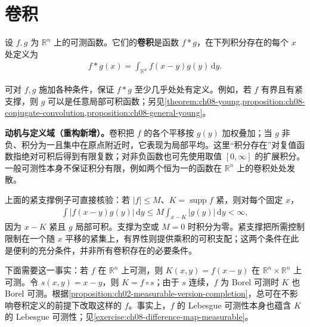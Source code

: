 \documentclass[../../main.tex]{subfiles}
\begin{document}
\section{卷积}\label{section:ch08-convolution}
\begin{definition}[卷积]\label{definition:ch08-convolution}
设 $f,g$ 为 $\mathbb R^n$ 上的可测函数。它们的\textbf{卷积}是函数 $f*g$，在下列积分存在的每个 $x$ 处定义为
\begin{align*}
f*g(x)=\int_{\mathbb R^n}f(x-y)g(y)\,\mathrm dy.
\end{align*}
\end{definition}
可对 $f,g$ 施加各种条件，保证 $f*g$ 至少几乎处处有定义。例如，若 $f$ 有界且有紧支撑，则 $g$ 可以是任意局部可积函数；另见\cref{theorem:ch08-young,proposition:ch08-conjugate-convolution,proposition:ch08-general-young}。
\begin{remark}
\textbf{动机与定义域（重构新增）。}卷积把 $f$ 的各个平移按 $g(y)$ 加权叠加；当 $g$ 非负、积分为一且集中在原点附近时，它表现为局部平均。这里“积分存在”对复值函数指绝对可积后得到有限复数；对非负函数也可先使用取值 $[0,\infty]$ 的扩展积分。一般可测性本身不保证积分有限，例如两个恒为一的函数在 $\mathbb R^n$ 上的卷积处处发散。

上面的紧支撑例子可直接核验：若 $|f|\leqslant M$、$K=\operatorname{supp}f$ 紧，则对每个固定 $x$，
\begin{align*}
\int|f(x-y)g(y)|\,\mathrm dy\leqslant M\int_{x-K}|g(y)|\,\mathrm dy<\infty,
\end{align*}
因为 $x-K$ 紧且 $g$ 局部可积。支撑为空或 $M=0$ 时积分为零。紧支撑把所需控制限制在一个随 $x$ 平移的紧集上，有界性则提供乘积的可积支配；这两个条件在此是便利的充分条件，并非所有卷积存在的必要条件。
\end{remark}
下面需要这一事实：若 $f$ 在 $\mathbb R^n$ 上可测，则 $K(x,y)=f(x-y)$ 在 $\mathbb R^n\times\mathbb R^n$ 上可测。令 $s(x,y)=x-y$，则 $K=f\circ s$；由于 $s$ 连续，$f$ 为 Borel 可测时 $K$ 也 Borel 可测。根据\cref{proposition:ch02-measurable-version-completion}，总可在不影响卷积定义的前提下改取这样的 $f$。事实上，$f$ 的 Lebesgue 可测性本身也蕴含 $K$ 的 Lebesgue 可测性；见\cref{exercise:ch08-difference-map-measurable}。
\end{document}
